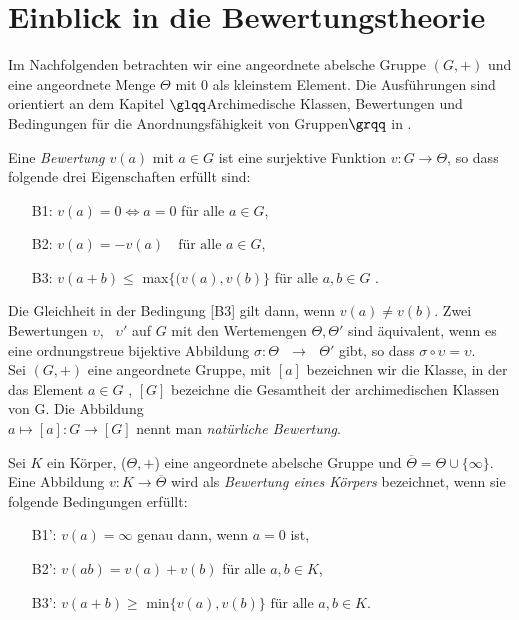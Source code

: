 \section{Einblick in die Bewertungstheorie}
Im Nachfolgenden betrachten wir eine angeordnete abelsche Gruppe $\left(G,+\right)$ und eine angeordnete Menge $\Theta$ mit $0$ als kleinstem Element. Die Ausführungen sind orientiert an dem Kapitel $\glqq$Archimedische Klassen, Bewertungen und Bedingungen für die Anordnungsfähigkeit von Gruppen$\grqq$ in \cite[S. 9 - 11]{priesscrampe83}.
%
%
\begin{defn} %
Eine \textit{Bewertung $v\left(a\right)$} mit $a\in G$ ist eine surjektive Funktion $v\colon G \rightarrow \Theta$, so dass folgende drei Eigenschaften erfüllt sind:
%
\begin{enumerate}
\item[B1:] $v{(a)} = 0 \Leftrightarrow a = 0$ für alle $a\in G$,
\item[B2:]  $v{(a)} = -v{(a)} \text{  } \text{ für alle } a \in G $,
\item[B3:] $ v{(a+ b)} \le$ max$\{(v{(a)}, v{(b)}\}$ für alle $ a, b \in G$ .
\end{enumerate}
%
\end{defn}
Die Gleichheit in der Bedingung [B3] gilt dann, wenn $v{(a)} \ne v{(b)} $. Zwei Bewertungen $\upsilon, \text{ } \upsilon' $ auf $G$ mit den Wertemengen $\Theta , \Theta' $ sind äquivalent, wenn es eine ordnungstreue bijektive Abbildung $\sigma \colon \Theta \text{ } \rightarrow \text{ } \Theta' $ gibt, so dass $ \sigma \circ \upsilon = \upsilon  $.\\
Sei $\left(G, +\right)$ eine angeordnete Gruppe, mit $[a]$ bezeichnen wir die Klasse, in der das Element $a\in G$ , $[G]$ bezeichne die Gesamtheit der archimedischen Klassen von G. Die Abbildung %
 \\$a \mapsto [a] \colon G \to [G]$ nennt man \textit{natürliche Bewertung}. %
\begin{defn}  \label{bewKoerper} %
Sei $K$ ein Körper, ($\Theta, +$) eine angeordnete abelsche Gruppe und $\overline{\Theta}  = \Theta \cup \lbrace\infty\rbrace $. Eine Abbildung $v\colon K \to \overline{\Theta} $ wird als \textit{Bewertung eines Körpers} bezeichnet, wenn sie folgende Bedingungen erfüllt:
\begin{enumerate}
\item[B1':] $v(a) = \infty$ genau dann, wenn $a = 0$ ist,
\item[B2':] $v(ab) = v\left(a\right)+v\left(b\right) $ für alle $ a, b \in K$,
\item[B3':] $v\left(a+b\right) \ge $ min$\lbrace v(a),v\left(b \right)\rbrace \text{ für alle }  a, b \in K. $
\end{enumerate}
\end{defn}
